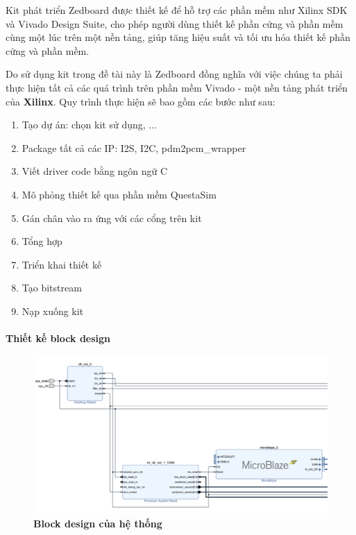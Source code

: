 Kit phát triển Zedboard được thiết kế để hỗ trợ các phần mềm như Xilinx SDK và Vivado Design Suite, cho phép người dùng thiết kế phần cứng và phần mềm cùng một lúc trên một nền tảng,  giúp tăng hiệu suất và tối ưu hóa thiết kế phần cứng và phần mềm.

Do sử dụng kit trong đề tài này là Zedboard đồng nghĩa với việc chúng ta phải thực hiện tất cả các quá trình trên phần mềm Vivado - một nền tảng phát triển của \textbf{Xilinx}.
Quy trình thực hiện sẽ bao gồm các bước như sau:
\begin{enumerate}
    \item Tạo dự án: chọn kit sử dụng, ...
    \item Package tất cả các IP: I2S, I2C, pdm2pcm\_wrapper
    \item Viết driver code bằng ngôn ngữ C
    \item Mô phỏng thiết kế qua phần mềm QuestaSim
    \item Gán chân vào ra ứng với các cổng trên kit
    \item Tổng hợp
    \item Triển khai thiết kế
    \item Tạo bitstream
    \item Nạp xuống kit
\end{enumerate}



\paragraph{Thiết kế block design}

\begin{figure}[H]
    \centering
    \includegraphics[width=15cm]{Images/Chuong5/fpga/block_design_1.png}
    \caption[Block design của hệ thống]{\bfseries \fontsize{12pt}{0pt}\selectfont Block design của hệ thống}
    \label{bd1}
\end{figure}

